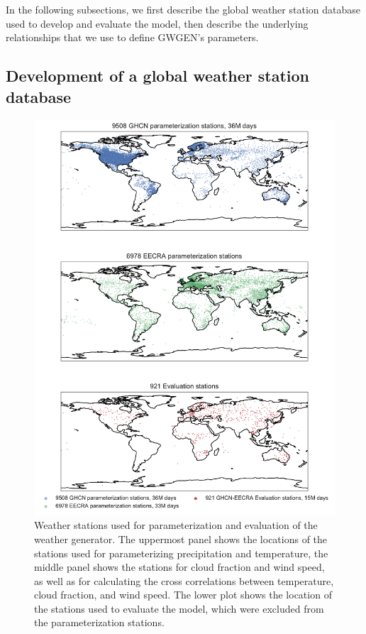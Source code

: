 \begin{refsection}
In the following subsections, we first describe the global weather station database used to develop and evaluate the model, then describe  the underlying relationships that we use to define GWGEN's parameters.

\subsection{Development of a global weather station database}

\begin{figure}
	\includegraphics[width=\linewidth]{gwgen-figures/f02.pdf}
	\caption[Weather stations used for parameterization and evaluation of the weather generator.]{Weather stations used for parameterization and evaluation of the weather generator. The uppermost panel shows the locations of the stations used for parameterizing precipitation and temperature, the middle panel shows the stations for cloud fraction and wind speed, as well as for calculating the cross correlations between temperature, cloud fraction, and wind speed. The lower plot shows the location of the stations used to evaluate the model, which were excluded from the parameterization stations.}
	\label{fig:stations}
\end{figure}


\end{refsection}
